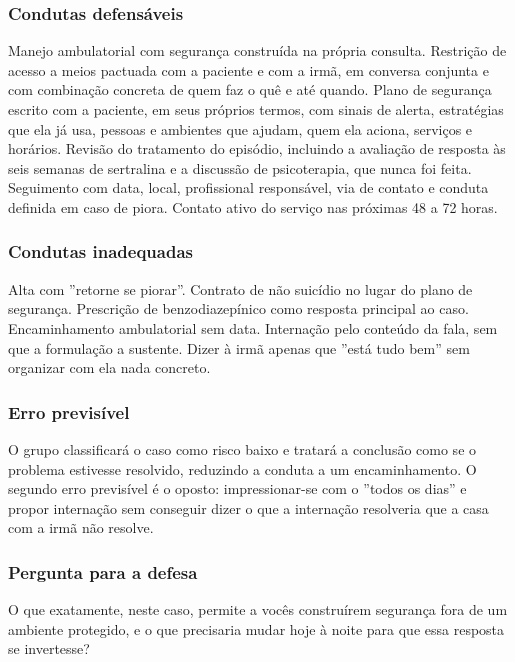 \subsubsection*{Condutas defensáveis}

Manejo ambulatorial com segurança construída na própria consulta. Restrição de acesso a meios pactuada com a paciente e com a irmã, em conversa conjunta e com combinação concreta de quem faz o quê e até quando. Plano de segurança escrito com a paciente, em seus próprios termos, com sinais de alerta, estratégias que ela já usa, pessoas e ambientes que ajudam, quem ela aciona, serviços e horários. Revisão do tratamento do episódio, incluindo a avaliação de resposta às seis semanas de sertralina e a discussão de psicoterapia, que nunca foi feita. Seguimento com data, local, profissional responsável, via de contato e conduta definida em caso de piora. Contato ativo do serviço nas próximas 48 a 72 horas.

\subsubsection*{Condutas inadequadas}

Alta com ''retorne se piorar''. Contrato de não suicídio no lugar do plano de segurança. Prescrição de benzodiazepínico como resposta principal ao caso. Encaminhamento ambulatorial sem data. Internação pelo conteúdo da fala, sem que a formulação a sustente. Dizer à irmã apenas que ''está tudo bem'' sem organizar com ela nada concreto.

\subsubsection*{Erro previsível}

O grupo classificará o caso como risco baixo e tratará a conclusão como se o problema estivesse resolvido, reduzindo a conduta a um encaminhamento. O segundo erro previsível é o oposto: impressionar-se com o ''todos os dias'' e propor internação sem conseguir dizer o que a internação resolveria que a casa com a irmã não resolve.

\subsubsection*{Pergunta para a defesa}

O que exatamente, neste caso, permite a vocês construírem segurança fora de um ambiente protegido, e o que precisaria mudar hoje à noite para que essa resposta se invertesse?

